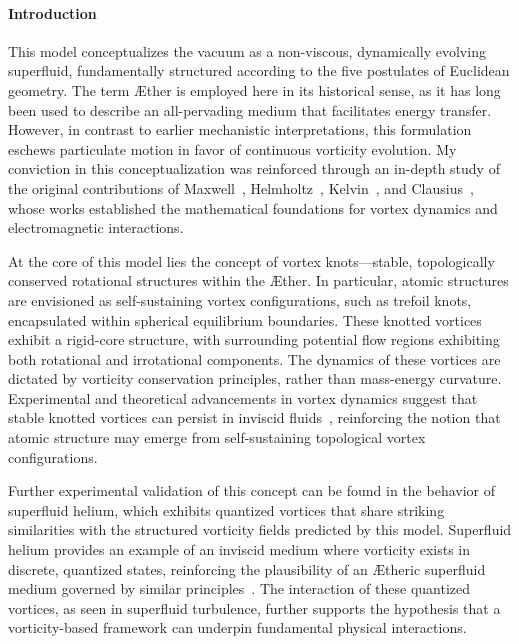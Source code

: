 \documentclass[a4paper,10pt]{article}
\begin{document}
    \paragraph{Introduction}
    This model conceptualizes the vacuum as a non-viscous, dynamically evolving superfluid, fundamentally structured according to the five postulates of Euclidean geometry. The term \AE ther is employed here in its historical sense, as it has long been used to describe an all-pervading medium that facilitates energy transfer. However, in contrast to earlier mechanistic interpretations, this formulation eschews particulate motion in favor of continuous vorticity evolution. My conviction in this conceptualization was reinforced through an in-depth study of the original contributions of Maxwell~\cite{maxwell1861}, Helmholtz~\cite{helmholtz1858}, Kelvin~\cite{kelvin1867}, and Clausius~\cite{clausius1865}, whose works established the mathematical foundations for vortex dynamics and electromagnetic interactions.

    At the core of this model lies the concept of vortex knots—stable, topologically conserved rotational structures within the \AE ther. In particular, atomic structures are envisioned as self-sustaining vortex configurations, such as trefoil knots, encapsulated within spherical equilibrium boundaries. These knotted vortices exhibit a rigid-core structure, with surrounding potential flow regions exhibiting both rotational and irrotational components. The dynamics of these vortices are dictated by vorticity conservation principles, rather than mass-energy curvature. Experimental and theoretical advancements in vortex dynamics suggest that stable knotted vortices can persist in inviscid fluids~\cite{kleckner2013}, reinforcing the notion that atomic structure may emerge from self-sustaining topological vortex configurations.

    Further experimental validation of this concept can be found in the behavior of superfluid helium, which exhibits quantized vortices that share striking similarities with the structured vorticity fields predicted by this model. Superfluid helium provides an example of an inviscid medium where vorticity exists in discrete, quantized states, reinforcing the plausibility of an \AE theric superfluid medium governed by similar principles~\cite{vinen2002}. The interaction of these quantized vortices, as seen in superfluid turbulence, further supports the hypothesis that a vorticity-based framework can underpin fundamental physical interactions.
\end{document}

